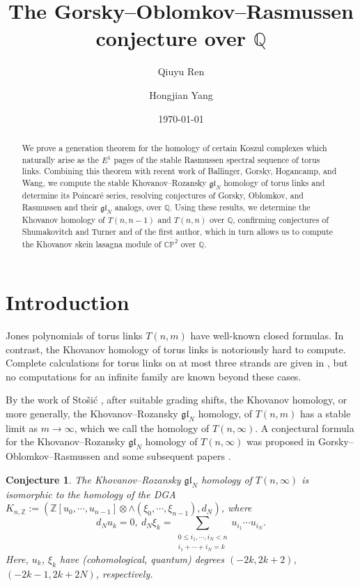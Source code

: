 \documentclass[reqno]{amsart}
\title{The Gorsky--Oblomkov--Rasmussen conjecture over $\mathbb{Q}$}
\author{Qiuyu Ren}
\author{Hongjian Yang}
\date{\today}
\newtheorem{conj}[thm]{Conjecture}
\theoremstyle{definition}
\theoremstyle{remark}
\newcommand{\Z}{\mathbb Z}
\begin{document}
\begin{abstract}
  We prove a generation theorem for the homology of certain Koszul complexes which naturally arise as the $E^1$ pages of the stable Rasmussen spectral sequence of torus links. Combining this theorem with recent work of Ballinger, Gorsky, Hogancamp, and Wang, we compute the stable Khovanov--Rozansky $\mathfrak{gl}_N$ homology of torus links and determine its Poincar\'e series, resolving conjectures of Gorsky, Oblomkov, and Rasmussen and their $\mathfrak{gl}_N$ analogs, over $\mathbb{Q}$. Using these results, we determine the Khovanov homology of $T(n,n-1)$ and $T(n,n)$ over $\mathbb{Q}$, confirming conjectures of Shumakovitch and Turner and of the first author, which in turn allows us to compute the Khovanov skein lasagna module of $\overline{\mathbb{CP}^2}$ over $\mathbb{Q}$.
\end{abstract}

\maketitle


\section{Introduction}
Jones polynomials of torus links $T(n,m)$ have well-known closed formulas. In contrast, the Khovanov homology of torus links is notoriously hard to compute. Complete calculations for torus links on at most three strands are given in \cite{khovanov2000categorification,turner2008spectral,stosic2009khovanov,gillam2012knot}, but no computations for an infinite family are known beyond these cases.

By the work of Sto\v{s}i\'{c} \cite{stosic2007homological,stosic2009khovanov}, after suitable grading shifts, the Khovanov homology, or more generally, the Khovanov--Rozansky $\mathfrak{gl}_N$ homology, of $T(n,m)$ has a stable limit as $m\to\infty$, which we call the homology of $T(n,\infty)$. A conjectural formula for the Khovanov--Rozansky $\mathfrak{gl}_N$ homology of $T(n,\infty)$ was proposed in Gorsky--Oblomkov--Rasmussen \cite{gorsky2013stable} and some subsequent papers \cite{gorsky2014torus,gorsky2015stable}.
\begin{conj}\label{conj:GOR}
The Khovanov--Rozansky $\mathfrak{gl}_N$ homology of $T(n,\infty)$ is isomorphic to the homology of the DGA $K_{n,\Z}:=(\Z[u_0,\cdots,u_{n-1}]\otimes\wedge(\xi_0,\cdots,\xi_{n-1}),d_N)$, where $$d_Nu_k=0,\ d_N\xi_k=\sum_{\substack{0\le i_1,\cdots,i_N<n\\i_1+\cdots+i_N=k}}u_{i_1}\cdots u_{i_N}.$$ Here, $u_k$, $\xi_k$ have (cohomological, quantum) degrees $(-2k,2k+2)$, $(-2k-1,2k+2N)$, respectively.
\end{conj}
\end{document}
